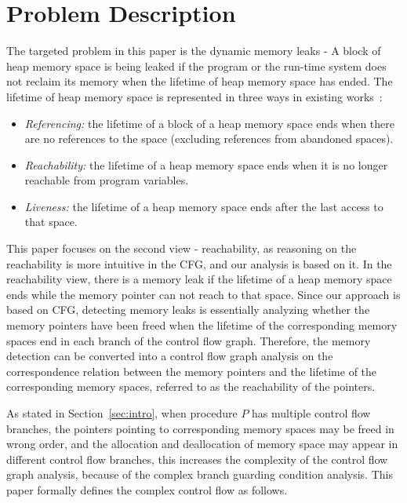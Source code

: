\section{Problem Description}\label{sec:description}
The targeted problem in this paper is the dynamic memory leaks - A block of heap memory space is being leaked if the program or the run-time system does not reclaim its memory when the lifetime of heap memory space has ended. 
The lifetime of heap memory space is represented in three ways in existing works~\cite{OR06}: 
\begin{itemize}
\item
\textit{Referencing:} the lifetime of a block of a heap memory space ends when there are no references to the space (excluding references from abandoned spaces).
\item 
\textit{Reachability:} the lifetime of a heap memory space ends when it is no longer reachable from program variables.
\item 
\textit{Liveness:} the lifetime of a heap memory space ends after the last access to that space.
\end{itemize}
This paper focuses on the second view - reachability, as reasoning on the reachability is more intuitive in the CFG, and our analysis is based on it.
In the reachability view, there is a memory leak if the lifetime of a heap memory space ends while the memory pointer can not reach to that space.
Since our approach is based on CFG, detecting memory leaks is essentially analyzing whether the memory pointers have been freed when the lifetime of the corresponding memory spaces end in each branch of the control flow graph. Therefore, the memory detection can be converted into a control flow graph analysis on the correspondence relation between the memory pointers and the lifetime of the corresponding memory spaces, referred to as the reachability of the pointers.

As stated in Section~\ref{sec:intro}, when procedure $P$ has multiple control flow branches, the pointers pointing to corresponding memory spaces may be freed in wrong order, and the allocation and deallocation of memory space may appear in different control flow branches, this increases the complexity of the control flow graph analysis, because of the complex branch guarding condition analysis. %
This paper formally defines the complex control flow as follows.

